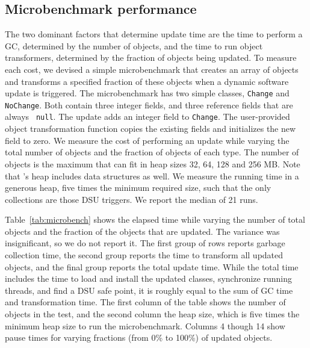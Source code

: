 
\subsection{Microbenchmark performance}
\label{subsec:microbench}

The two dominant factors that determine \JV update time are the time to
perform a GC, determined by the number of objects, and the time to run
object transformers, determined by the fraction of objects being updated.
To measure each cost, we devised a simple microbenchmark that
creates an array of objects and transforms a specified fraction of these
objects when a dynamic software update is triggered. The microbenchmark has
two simple classes, \texttt{Change} and \texttt{NoChange}. Both contain
three integer fields, and three reference fields that are always {\tt
null}. The update adds an integer field to {\tt Change}. The user-provided
object transformation function copies the existing fields and initializes
the new field to zero.
We measure the cost of performing an update while varying the total number
of objects and the fraction of objects of each type. The number of objects
is the maximum that can fit in heap sizes 32, 64, 128 and 256 MB\@.  Note
that \RVM's heap includes \VM data structures as well. We measure the
running time in a generous heap, five times the minimum required size, such
that the only collections are those DSU triggers. We report the median of
21 runs.




Table~\ref{tab:microbench} shows the elapsed time while varying the number
of total objects and the fraction of the objects that are updated.  The
variance was insignificant, so we do not report it.  The first group of
rows reports garbage collection time, the second group reports the time to
transform all updated objects, and the final group reports the total update
time. While the total time includes the time to load and install the
updated classes, synchronize running threads, and find a DSU safe point, it
is roughly equal to the sum of GC time and transformation time.  The first
column of the table shows the number of objects in the test, and the second
column the heap size, which is five times the minimum heap size to run the
microbenchmark. Columns 4 though 14 show pause times for varying fractions
(from 0\% to 100\%) of updated objects. 

